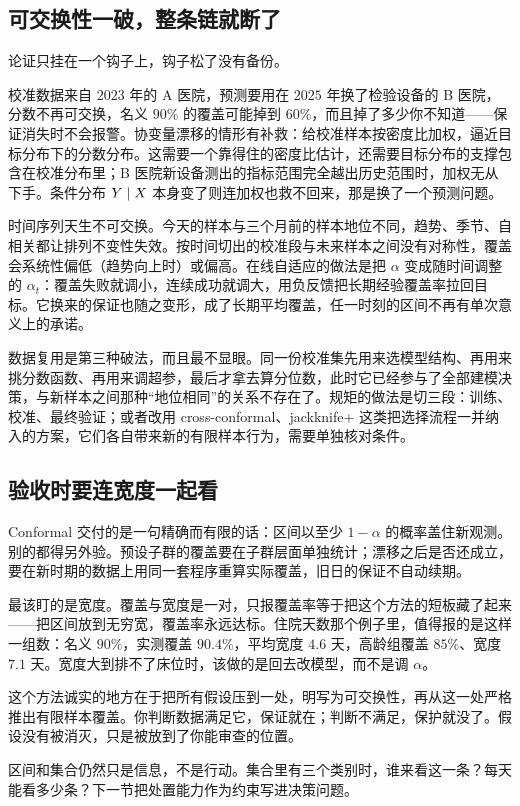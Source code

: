 \subsection{可交换性一破，整条链就断了}

论证只挂在一个钩子上，钩子松了没有备份。

校准数据来自 \(2023\) 年的 A 医院，预测要用在 \(2025\) 年换了检验设备的 B 医院，分数不再可交换，名义 \(90\%\) 的覆盖可能掉到 \(60\%\)，而且掉了多少你不知道——保证消失时不会报警。协变量漂移的情形有补救：给校准样本按密度比加权，逼近目标分布下的分数分布。这需要一个靠得住的密度比估计，还需要目标分布的支撑包含在校准分布里；B 医院新设备测出的指标范围完全越出历史范围时，加权无从下手。条件分布 \(Y\mid X\) 本身变了则连加权也救不回来，那是换了一个预测问题。

时间序列天生不可交换。今天的样本与三个月前的样本地位不同，趋势、季节、自相关都让排列不变性失效。按时间切出的校准段与未来样本之间没有对称性，覆盖会系统性偏低（趋势向上时）或偏高。在线自适应的做法是把 \(\alpha\) 变成随时间调整的 \(\alpha_t\)：覆盖失败就调小，连续成功就调大，用负反馈把长期经验覆盖率拉回目标。它换来的保证也随之变形，成了长期平均覆盖，任一时刻的区间不再有单次意义上的承诺。

数据复用是第三种破法，而且最不显眼。同一份校准集先用来选模型结构、再用来挑分数函数、再用来调超参，最后才拿去算分位数，此时它已经参与了全部建模决策，与新样本之间那种``地位相同''的关系不存在了。规矩的做法是切三段：训练、校准、最终验证；或者改用 cross-conformal、jackknife+ 这类把选择流程一并纳入的方案，它们各自带来新的有限样本行为，需要单独核对条件。

\subsection{验收时要连宽度一起看}

Conformal 交付的是一句精确而有限的话：区间以至少 \(1-\alpha\) 的概率盖住新观测。别的都得另外验。预设子群的覆盖要在子群层面单独统计；漂移之后是否还成立，要在新时期的数据上用同一套程序重算实际覆盖，旧日的保证不自动续期。

最该盯的是宽度。覆盖与宽度是一对，只报覆盖率等于把这个方法的短板藏了起来——把区间放到无穷宽，覆盖率永远达标。住院天数那个例子里，值得报的是这样一组数：名义 \(90\%\)，实测覆盖 \(90.4\%\)，平均宽度 \(4.6\) 天，高龄组覆盖 \(85\%\)、宽度 \(7.1\) 天。宽度大到排不了床位时，该做的是回去改模型，而不是调 \(\alpha\)。

这个方法诚实的地方在于把所有假设压到一处，明写为可交换性，再从这一处严格推出有限样本覆盖。你判断数据满足它，保证就在；判断不满足，保护就没了。假设没有被消灭，只是被放到了你能审查的位置。

区间和集合仍然只是信息，不是行动。集合里有三个类别时，谁来看这一条？每天能看多少条？下一节把处置能力作为约束写进决策问题。
